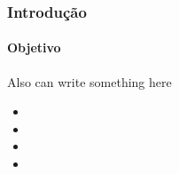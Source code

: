 \begin{frame}
\frametitle{Introdução}
    \framesubtitle{Objetivo}
        
        Also can write something here \myblabla \mylipsum
        \begin{itemize}[<+->]
            \item \myliplip
            \item \myliplip
            \item \myblabla
            \item \mylipsum
        \end{itemize}
\end{frame}
 